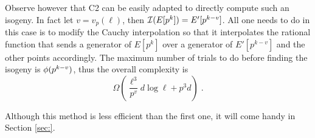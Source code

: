 Observe however that C2 can be easily adapted to directly compute such
an isogeny. In fact let $v=v_p(\ell)$, then $\mathcal{I}(E[p^k]) =
E'[p^{k-v}]$. All one needs to do in this case is to modify the Cauchy
interpolation so that it interpolates the rational function that sends
a generator of $E[p^k]$ over a generator of $E'[p^{k-v}]$ and the
other points accordingly. The maximum number of trials to do before
finding the isogeny is $\phi(p^{k-v})$, thus the overall complexity
is
\begin{equation}
  \label{eq:C2:complexity-non-prime}
  \Omega\left(\frac{\ell^3}{p^v}d\log\ell + p^3d\right)
  \;\text{.}
\end{equation}

Although this method is less efficient than the first one, it will
come handy in Section \ref{sec:}.



%
